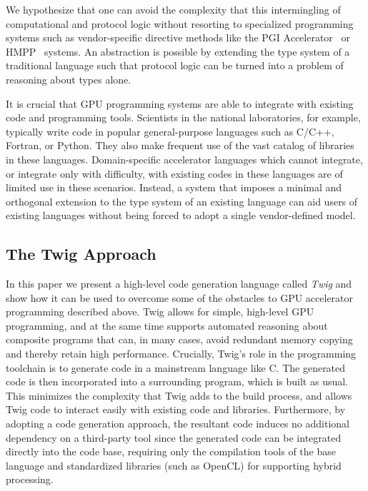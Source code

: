 We hypothesize that one can avoid the complexity that this intermingling of
computational and protocol logic without resorting to specialized programming
systems such as vendor-specific directive methods like the PGI
Accelerator~\cite{pgi-accelerate} or HMPP~\cite{hmpp} systems. An abstraction is
possible by extending the type system of a traditional language such that
protocol logic can be turned into a problem of reasoning about types alone.


It is crucial that GPU programming systems are able to integrate with existing
code and programming tools. Scientists in the national laboratories, for
example, typically write code in popular general-purpose languages such as
C/C++, Fortran, or Python. They also make frequent use of the vast catalog of
libraries in these languages. Domain-specific accelerator languages which cannot
integrate, or integrate only with difficulty, with existing codes in these
languages are of limited use in these scenarios. Instead, a system that imposes
a minimal and orthogonal extension to the type system of an existing language
can aid users of existing languages without being forced to adopt a single
vendor-defined model.

\subsection{The Twig Approach}

In this paper we present a high-level code generation language called
\emph{Twig} and show how it can be used to overcome some of the obstacles to GPU
accelerator programming described above. Twig allows for simple, high-level GPU
programming, and at the same time supports automated reasoning about composite
programs that can, in many cases, avoid redundant memory copying and thereby
retain high performance. Crucially, Twig's role in the programming toolchain is
to generate code in a mainstream language like C. The generated code is then
incorporated into a surrounding program, which is built as usual. This minimizes
the complexity that Twig adds to the build process, and allows Twig code to
interact easily with existing code and libraries. Furthermore, by adopting a
code generation approach, the resultant code induces no additional dependency on
a third-party tool since the generated code can be integrated directly into the
code base, requiring only the compilation tools of the base language and
standardized libraries (such as OpenCL) for supporting hybrid processing.

